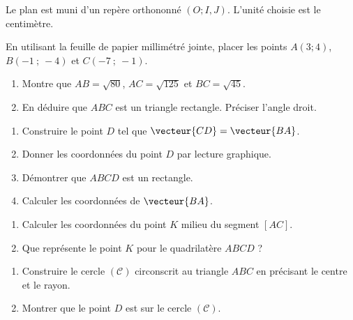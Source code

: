 Le plan est muni d'un repère orthononné $(O;  I, J)$. L'unité choisie est le centimètre.
\begin{myenumerate}
\item En utilisant la feuille de papier millimétré jointe, placer les points
$A(3 ; 4)$, $B(- 1~ ;~- 4)$ et $C(-7 ~;~-1)$.
\item \begin{enumerate}
\item Montre que $AB= \sqrt{80}$, $AC= \sqrt{125}$ et $BC = \sqrt{45}$.
\item En déduire que $ABC$ est un triangle rectangle. Préciser l'angle droit.
\end{enumerate}
\item \begin{enumerate}
\item Construire le point $D$ tel que $\vecteur{CD} = \vecteur{BA}$.
\item Donner les coordonnées du point $D$ par lecture graphique.
\item Démontrer que $ABCD$ est un rectangle.
\item Calculer les coordonnées de $\vecteur{BA}$.
\end{enumerate}
\item \begin{enumerate}
\item Calculer les coordonnées du point $K$ milieu du segment $[AC]$.
\item Que représente le point $K$ pour le quadrilatère $ABCD$ ?
 \end{enumerate}
\item \begin{enumerate}
\item Construire le cercle $(\mathscr{C})$ circonscrit au triangle $ABC$ en précisant le centre et le rayon.
\item Montrer que le point $D$ est sur le cercle $(\mathscr{C})$.
\end{enumerate}
\end{myenumerate}